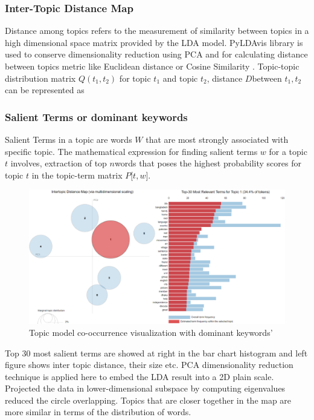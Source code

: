 \documentclass[sn-mathphys,Numbered]{sn-jnl}%
\theoremstyle{thmstyleone}%
\theoremstyle{thmstyletwo}%
\theoremstyle{thmstylethree}%
\begin{document}
\subsubsection{Inter-Topic Distance Map}

Distance among topics refers to the measurement of similarity between
topics in a high dimensional space matrix provided by the LDA model.
PyLDAvis library is used to conserve dimensionality reduction using PCA
and for calculating distance between topics metric like Euclidean
distance or Cosine Similarity \(\). Topic-topic distribution matrix
\(Q\left( t_{1},t_{2} \right)\) for topic \(t_{1}\) and topic \(t_{2}\),
distance \(D\)between \(t_{1},t_{2}\) can be represented as

\subsubsection{Salient Terms or dominant keywords}

Salient Terms in a topic are words \(W\) that are most strongly
associated with specific topic. The mathematical expression for finding
salient terms \(w\) for a topic \(t\) involves, extraction of top
\(n\)words that poses the highest probability scores for topic \(t\) in
the topic-term matrix \(P\lbrack t,w\rbrack\).

\begin{figure}[h]
\centerline{\includegraphics[width=\textwidth]{pyldvis.png}}
\caption{Topic model co-occurrence visualization with dominant keywords'}
\label{fig:Relative_weight}
\end{figure}

Top 30 most salient terms are showed at right in the bar chart histogram
and left figure shows inter topic distance, their size etc. PCA
dimensionality reduction technique is applied here to embed the LDA
result into a 2D plain scale. Projected the data in lower-dimensional
subspace by computing eigenvalues reduced the circle overlapping. Topics
that are closer together in the map are more similar in terms of the
distribution of words.
\end{document}
